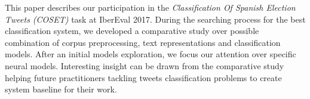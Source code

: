 \abstract

This paper describes our participation in the \emph{Classification Of Spanish Election Tweets (COSET)} task at IberEval 2017.
During the searching process for the best classification system, we developed a comparative study over possible combination of corpus preprocessing, text representations and classification models. After an initial models exploration, we focus our attention over specific neural models.
Interesting insight can be drawn from the comparative study helping future practitioners tackling tweets classification problems to create system baseline for their work.